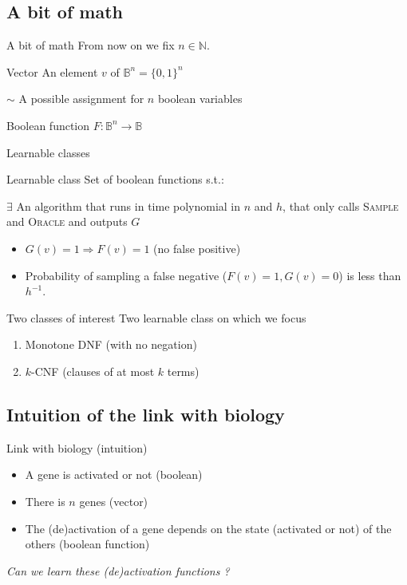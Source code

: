 \documentclass{beamer}
\begin{document}
\subsection{A bit of math}
\begin{frame}{A bit of math}
	From now on we fix $n \in \mathbb{N}$.
	\begin{block}{Vector}
	An element $v$ of $\mathbb{B}^n = \{0,1\}^n$
	\vspace{1em}
	
	$\sim$ A possible assignment for $n$ boolean variables
	\end{block}
\begin{block}{Boolean function}
	$F : \mathbb{B}^n \longrightarrow \mathbb{B}$
\end{block}
\end{frame}
\begin{frame}{Learnable classes}
\begin{block}{Learnable class}
		Set of boolean functions s.t.:
		\vspace{1em}
		
		$\exists$ An algorithm that runs in time polynomial in $n$ and $h$, that only calls \textsc{Sample} and \textsc{Oracle}
		\vspace{1em} and outputs $G$
		
		\begin{itemize}
			\item $G(v) = 1 \Rightarrow F(v) = 1$ (no false positive)
			\item Probability of sampling a false negative ($F(v) = 1, G(v)=0$) is less than $h^{-1}$.
		\end{itemize}
\end{block}
\end{frame}
\begin{frame}{Two classes of interest}
Two learnable class on which we focus
\begin{enumerate}
	\item Monotone DNF (with no negation)
	\item $k$-CNF (clauses of at most $k$ terms)
\end{enumerate}
\end{frame}
\subsection{Intuition of the link with biology}
\begin{frame}{Link with biology (intuition)}
	\begin{itemize}
		\item A gene is activated or not (boolean)
		\item There is $n$ genes  (vector)
		\item The (de)activation of a gene depends on the state (activated or not) of the others (boolean function)
	\end{itemize}
\centering
\slshape
Can we learn these (de)activation functions ?
\end{frame}
\end{document}
